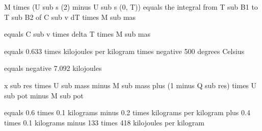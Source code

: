 M times (U sub s (2) minus U sub s (0, T)) equals the integral from T sub B1 to T sub B2 of C sub v dT times M sub mas

equals C sub v times delta T times M sub mas

equals 0.633 times kilojoules per kilogram times negative 500 degrees Celsius

equals negative 7.092 kilojoules

x sub res times U sub mass minus M sub mass plus (1 minus Q sub res) times U sub pot minus M sub pot

equals 0.6 times 0.1 kilograms minus 0.2 times kilograms per kilogram plus 0.4 times 0.1 kilograms minus 133 times 418 kilojoules per kilogram